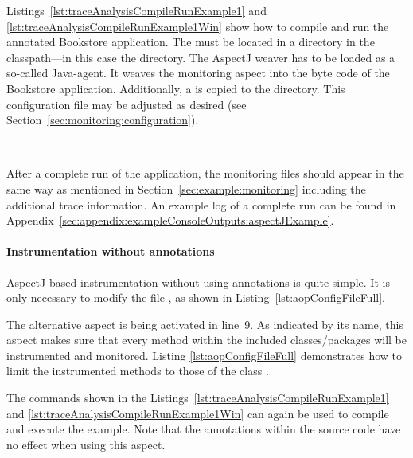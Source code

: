 Listings~\ref{lst:traceAnalysisCompileRunExample1} and %
\ref{lst:traceAnalysisCompileRunExample1Win} show how to compile and run the annotated %
Bookstore application. The \file{\aopConfigFile} must be located in a %
 directory in the classpath---in this case the  directory. %
The AspectJ weaver has to be loaded as a so-called Java-agent. It weaves the %
monitoring aspect into the byte code of the Bookstore application. %
Additionally, a \file{\kiekerMonitoringProperties{}} is copied to the  directory. %
This configuration file may be adjusted as desired (see Section~\ref{sec:monitoring:configuration}).

\


\setBashListing



\noindent After a complete run of the application, the monitoring files should appear in %
the same way as mentioned in Section~\ref{sec:example:monitoring} including the %
additional trace information. An example log of a complete run can be found in %
Appendix~\ref{sec:appendix:exampleConsoleOutputs:aspectJExample}.

\paragraph*{Instrumentation without annotations}%

AspectJ-based instrumentation without using annotations is quite simple. It is %
only necessary to modify the file \file{\aopConfigFile{}}, as shown %
in Listing~\ref{lst:aopConfigFileFull}.
\pagebreak
\setXMLListing


\noindent The alternative aspect  is being %
activated in line~9. As indicated by its name, this aspect makes sure that every %
method within the included classes/packages will be instrumented and monitored. %
Listing \ref{lst:aopConfigFileFull} demonstrates how to limit the %
instrumented methods to those of the class .

The commands shown in the Listings~\ref{lst:traceAnalysisCompileRunExample1} and %
\ref{lst:traceAnalysisCompileRunExample1Win} can again be used to compile and execute %
the example. Note that the annotations within the source code have no effect %
when using this aspect.

